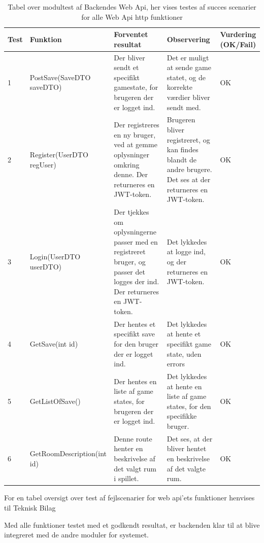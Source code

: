 \begin{table}[H]
\caption{Tabel over modultest af Backendes Web Api, her vises testes af succes scenarier for alle Web Api http funktioner }%
\label{table: succes}
\begin{tabular}{|p{0.75cm}|p{3.6cm}|p{3.5cm}|p{3.5cm}|p{1.9cm}|} \hline
 \textbf{Test} & \textbf{Funktion} & \textbf{Forventet resultat} & \textbf{Observering} & \textbf{Vurdering} \textbf{(OK/Fail)}\\\hline
 1 & PostSave(SaveDTO saveDTO) & Der bliver sendt et specifikt gamestate, for brugeren der er logget ind. & Det er muligt at sende game statet, og de korrekte værdier bliver sendt med. & OK \\ \hline
 2 & Register(UserDTO regUser) & Der registreres en ny bruger, ved at gemme oplysninger omkring denne. Der returneres en JWT-token. & Brugeren bliver registreret, og kan findes blandt de andre brugere. Det ses at der returneres en JWT-token. & OK \\ \hline
 3 & Login(UserDTO userDTO) & Der tjekkes om oplysningerne passer med en registreret bruger, og passer det logges der ind. Der returneres en JWT-token. & Det lykkedes at logge ind, og der returneres en JWT-token.  & OK \\ \hline
 4 & GetSave(int id) & Der hentes et specifikt save for den bruger der er logget ind. & Det lykkedes at hente et specifikt game state, uden errors  & OK \\ \hline
 5 & GetListOfSave() & Der hentes en liste af game states, for brugeren der er logget ind. & Det lykkedes at hente en liste af game states, for den specifikke bruger. & OK \\ \hline
 6 & GetRoomDescription(int id) & Denne route henter en beskrivelse af det valgt rum i spillet. & Det ses, at der bliver hentet en beskrivelse af det valgte rum. & OK \\ \hline
\end{tabular}
\end{table}

For en tabel oversigt over test af fejlscenarier for web api'ets funktioner henvises til Teknisk Bilag \parencite[][Section 11.4]{TekniskBilag}

Med alle funktioner testet med et godkendt resultat, er backenden klar til at blive integreret med de andre moduler for systemet.



\newpage
